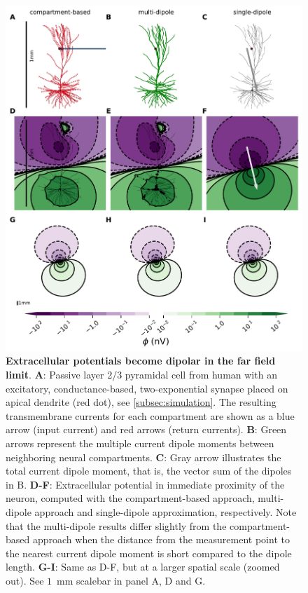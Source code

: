 \documentclass[preprint,10pt,authoryear]{elsarticle}
\newcommand{\hlp}[2][Purple]{ {\sethlcolor{#1} \hl{#2}} }
\newcommand{\gen}[1]{\color{white}{\hlp{GTE: #1 }}\color{black}}
\begin{document}
\begin{figure}[H]
	\centering
	\includegraphics[width=1.0\textwidth]{fig_dipole_field_passiveTrue_single_syn481}
	\caption{\textbf{Extracellular potentials become dipolar in the far field limit}. 
		\textbf{A}: Passive layer 2/3 pyramidal cell from human \citep{EYAL2016} with an excitatory, conductance-based, two-exponential synapse placed on apical dendrite (red dot), see \ref{subsec:simulation}. The resulting transmembrane currents for each compartment are shown as a blue arrow (input current) and red arrows (return currents).
		\textbf{B}: Green arrows represent the multiple current dipole moments between neighboring neural compartments.
		\textbf{C}: Gray arrow illustrates the total current dipole moment, that is, the vector sum of the dipoles in B.
	\textbf{D-F}: Extracellular potential in immediate proximity of the neuron, computed with the compartment-based approach, multi-dipole approach and single-dipole approximation, respectively. Note that the multi-dipole results differ slightly from the compartment-based approach when the distance from the measurement point to the nearest current dipole moment is short compared to the dipole length.
\textbf{G-I}: Same as D-F, but at a larger spatial scale (zoomed out). See $1$~mm scalebar in panel A, D and G.
}
\label{fig:dipole_field}
\end{figure}
\end{document}

